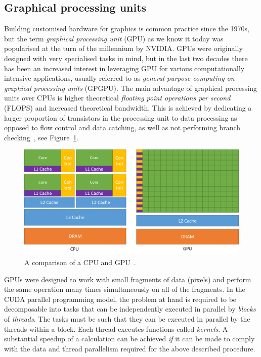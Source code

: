 \documentclass[final,3p,times,twocolumn]{elsarticle}
\begin{document}
		
	\subsection{Graphical processing units}
	Building customised hardware for graphics is common practice since the 1970s, but the term \emph{graphical processing unit} (GPU) as we know it today was popularised at the turn of the millennium by NVIDIA. GPUs were originally designed with very specialised tasks in mind, but in the last two decades there has been an increased interest in leveraging GPU for various computationally intensive applications, usually referred to as \emph{general-purpose computing on graphical processing units} (GPGPU). The main advantage of graphical processing units over CPUs is higher theoretical \emph{floating point operations per second} (FLOPS) and increased theoretical bandwidth. This is achieved by dedicating a larger proportion of transistors in the processing unit to data processing as opposed to flow control and data catching, as well as not performing branch checking~\cite{cuda}, see Figure~\ref{fig:cuda-gpu}.
	\begin{figure}[h]
		\centering
		\includegraphics[width=\linewidth]{../diagrams/cuda-gpu}
		\caption{A comparison of a CPU and GPU~\cite{cuda}.}
		\label{fig:cuda-gpu}
	\end{figure}
	GPUs were designed to work with small fragments of data (pixels) and perform the same operation many times simultaneously on all of the fragments. In the CUDA parallel programming model, the problem at hand is required to be decomposable into tasks that can be independently executed in parallel by \emph{blocks} of \emph{threads}. The tasks must be such that they can be executed in parallel by the threads within a block. Each thread executes functions called \emph{kernels}. A substantial speedup of a calculation can be achieved \emph{if} it can be made to comply with the data and thread parallelism required for the above described procedure. 
	
\end{document}

